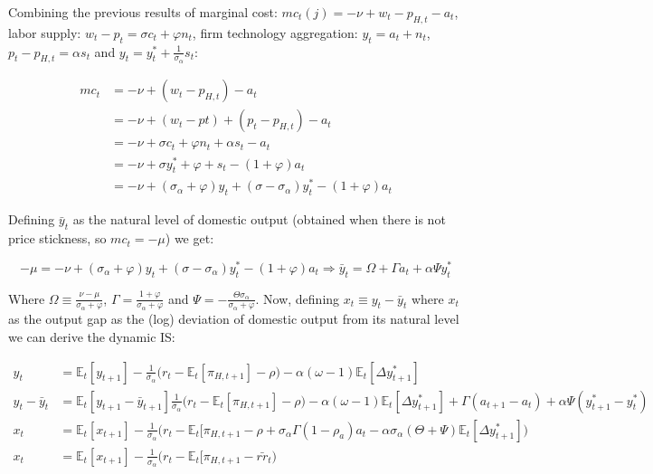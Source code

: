 \documentclass{article}
\newcommand{\Et}{\mathbb{E}_t}
\begin{document}
Combining the previous results of marginal cost: $mc_t(j) = -\nu + w_t - p_{H,t} - a_t$, labor supply: $w_t - p_t = \sigma c_t + \varphi n_t$, firm technology aggregation: $y_t = a_t + n_t$, $p_t - p_{H,t} = \alpha s_t$ and $y_t = y_t^* + \frac{1}{\sigma_\alpha} s_t$:

\begin{equation*}
    \begin{split}
    mc_t & = -\nu + (w_t - p_{H, t}) - a_t\\
    & = -\nu + (w_t - pt) + (p_t - p_{H, t}) - a_t\\
    & = -\nu + \sigma c_t + \varphi n_t + \alpha s_t - a_t\\
    & = -\nu + \sigma y_t^* + \varphi + s_t - (1+ \varphi) a_t\\
    & = -\nu + (\sigma_\alpha + \varphi) y_t + (\sigma - \sigma_\alpha) y_t^* - (1+ \varphi) a_t
    \end{split}
\end{equation*}

Defining $\bar y_t$ as the natural level of domestic output (obtained when there is not price stickness, so $mc_t = -\mu$) we get:

$$-\mu = -\nu + (\sigma_\alpha + \varphi) y_t + (\sigma - \sigma_\alpha) y_t^* - (1+ \varphi) a_t \Rightarrow \bar y_t = \Omega + \Gamma a_t + \alpha \Psi y_t^*$$

Where $\Omega \equiv \frac{\nu - \mu}{\sigma_\alpha + \varphi}$, $\Gamma = \frac{1 + \varphi}{\sigma_\alpha + \varphi}$ and $\Psi = -\frac{\Theta \sigma_\alpha}{\sigma_\alpha + \varphi}$. Now, defining $x_t \equiv y_t - \bar y_t$ where $x_t$ as the output gap as the (log) deviation of domestic output from its natural level we can derive the dynamic IS:

\begin{equation*}
    \begin{split}
        y_t &= \Et[y_{t+1}] - \frac{1}{\sigma_\alpha} \Big(r_t - \Et [\pi_{H, t+1}] - \rho \Big) - \alpha(\omega-1) \Et[\Delta y^*_{t+1}]\\
        y_t - \bar y_t &= \Et[y_{t+1} -\bar y_{t+1}] \frac{1}{\sigma_\alpha} \Big(r_t - \Et [\pi_{H, t+1}]  - \rho \Big) - \alpha(\omega-1) \Et[\Delta y^*_{t+1}] + \Gamma(a_{t+1}- a_t)  + \alpha \Psi (y_{t+1}^* - y_t^*)\\
        x_t & = \Et [x_{t+1}] - \frac{1}{\sigma_\alpha} \Big(r_t - \Et[\pi_{H,t+1} - \rho + \sigma_\alpha \Gamma (1-\rho_a)a_t - \alpha \sigma_\alpha (\Theta + \Psi) \Et[\Delta y_{t+1}^*] \Big)\\
        x_t & = \Et [x_{t+1}] - \frac{1}{\sigma_\alpha} \Big(r_t - \Et[\pi_{H,t+1} - \bar{rr}_t \Big)
    \end{split}
\end{equation*}
\end{document}
